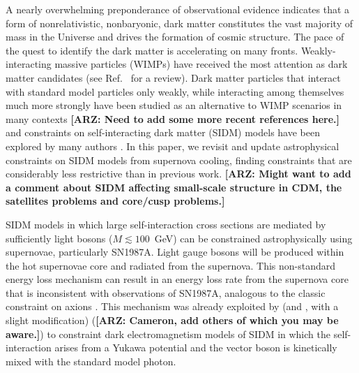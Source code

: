 \documentclass[nofootinbib,prd,superscriptaddress,twocolumn]{revtex4}
\newcommand{\arz}[1]{{{\bf{\color{BrickRed}[ARZ: #1]}}}}
\begin{document}
A nearly overwhelming preponderance of observational evidence indicates that a form of nonrelativistic, nonbaryonic, 
dark matter constitutes the vast majority of mass in the Universe and drives the formation of cosmic structure. 
The pace of the quest to identify the dark matter is accelerating on many fronts. Weakly-interacting massive 
particles (WIMPs) have received the most attention as dark matter candidates (see Ref.~\cite{jungman_etal96} for a review). 
Dark matter particles that interact with standard model particles only weakly, while interacting among themselves 
much more strongly have been studied as an alternative to WIMP scenarios in many contexts 
\cite{carlson_etal92,deLaix_etal95,atrio-barandela_davidson97,spergel_steinhardt00,hogan_dalcanton00,mohapatra_teplitz00,
dave_etal01,hisano_etal04,hisano_etal05,pospelov_etal08,arkani-hamed_etal08a,lattanzi_silk08,ackerman_etal09,feng_etal09,
kong_etal15} \arz{Need to add some more recent references here.} 
and constraints on self-interacting dark matter (SIDM) models have been explored by many authors \cite{yoshida_etal00,gnedin_ostriker01,miralda-escude02,randall_etal08,kamionkowski_profumo08,zentner09,robertson_zentner09,pieri_etal09,spolyar_etal09,finkbeiner_etal09,
slatyer_etal09,bramante_etal14,albuquerque_etal14,kaplinghat_etal14,chen_etal14,feng_etal16,catena_widmark16}.
In this paper, we revisit and update astrophysical constraints on SIDM models from 
supernova cooling, finding constraints that are considerably less restrictive than in 
previous work. 
\arz{Might want to add a comment about SIDM affecting small-scale structure in CDM, the satellites problems and core/cusp problems.}


SIDM models in which large self-interaction cross sections are mediated by sufficiently light 
bosons ($M \lesssim 100$~GeV) can be constrained astrophysically using supernovae, particularly 
SN1987A. Light gauge bosons will be produced within the hot supernovae core and 
radiated from the supernova. This non-standard energy loss mechanism can result in an energy loss rate 
from the supernova core that is inconsistent with observations of SN1987A, analogous to the 
classic constraint on axions \cite{turner88,raffelt96_book}. This mechanism was already exploited by 
\cite{dent_etal12} (and \cite{rrapaj_reddy16}, with a slight modification) (\arz{Cameron, add others of which you may be aware.}) 
to constraint dark electromagnetism models of SIDM in which the self-interaction arises from a Yukawa potential 
and the vector boson is kinetically mixed with the standard model photon.
\end{document}
